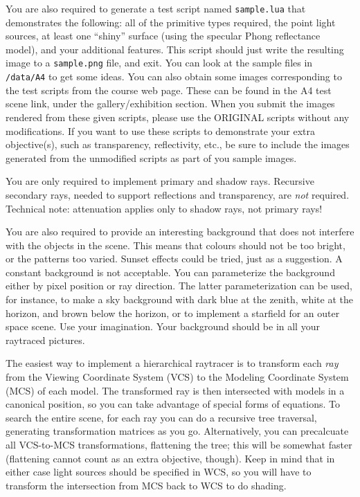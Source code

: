 You are also required to generate a test script named {\tt sample.lua}
that demonstrates the following:
all of the primitive types required, the 
point light sources, at least one ``shiny'' surface 
(using the specular Phong reflectance model), and your additional
features.
This script should just write
the resulting image to a {\tt sample.png} file, and exit.
You can look at the sample files in 
{\tt \CourseData/data/A4} 
to get some ideas. You can also obtain some images corresponding to
the test scripts from the course web page. These can be found
in the A4 test scene link, under the gallery/exhibition section.
When you submit the images rendered from these given scripts,
please use the ORIGINAL scripts without any modifications. If you
want to use these scripts to demonstrate your extra objective(s),
such as transparency, reflectivity, etc., be sure to include the
images generated from the unmodified scripts as part of you sample
images.

You are only required to implement primary and 
shadow rays.  Recursive secondary rays, needed to support
reflections and transparency, are {\em not\/} required.
Technical note: attenuation applies only to shadow
rays, not primary rays!

You are also required to provide an interesting background that does not
interfere with the objects in the scene.  This means that colours should
not be too bright, or the patterns too varied.  Sunset effects could 
be tried, just as a suggestion.  
A constant background is not acceptable.   You can parameterize the
background either by pixel position or ray direction.
The latter parameterization can be used, for instance, 
to make a sky background with dark blue at the zenith, 
white at the horizon, and brown below the horizon, or to implement
a starfield for an outer space scene.  Use your imagination.
Your background should be in all your raytraced pictures.

The easiest way to implement a hierarchical raytracer is to transform
each {\em ray\/} from the Viewing Coordinate System (VCS) to the
Modeling Coordinate System (MCS) of each model.  
The transformed ray is then
intersected with models in a canonical position, so you can
take advantage of special forms of equations.  
To search the entire scene, for
each ray you can do a recursive tree traversal, generating
transformation matrices as you go.    Alternatively, you can
precalcuate all VCS-to-MCS transformations, flattening the tree;
this will be somewhat faster (flattening cannot count as an extra
objective, though).
Keep in mind that in either case
light sources should be specified in WCS, so you will have to transform
the intersection from MCS back to WCS to do shading.


